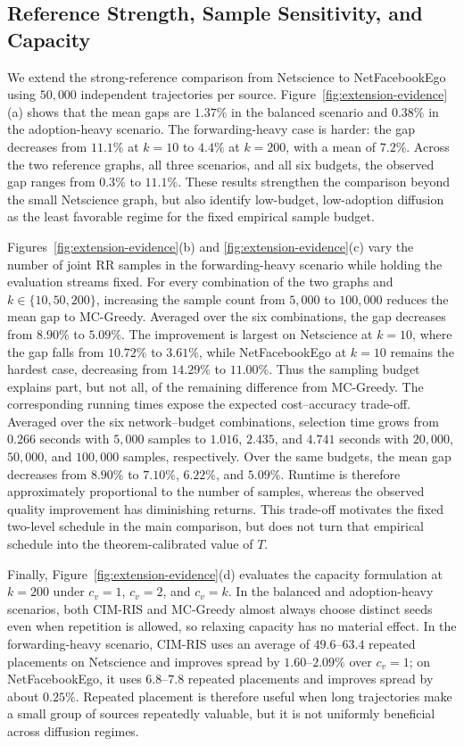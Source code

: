 \documentclass[sigconf,balance=false]{acmart}
\newcommand{\CIMRIS}{\textsc{CIM-RIS}}
\begin{document}
\subsection{Reference Strength, Sample Sensitivity, and Capacity}
\label{sec:exp-robustness}

We extend the strong-reference comparison from Netscience to
NetFacebookEgo using $50{,}000$ independent trajectories per source.
Figure~\ref{fig:extension-evidence}(a) shows that the mean gaps are
$1.37\%$ in the balanced scenario and $0.38\%$ in the adoption-heavy
scenario. The forwarding-heavy case is harder: the gap decreases from
$11.1\%$ at $k=10$ to $4.4\%$ at $k=200$, with a mean of $7.2\%$.
Across the two reference graphs, all three scenarios, and all six budgets,
the observed gap ranges from $0.3\%$ to $11.1\%$.
These results strengthen the comparison beyond the small Netscience graph,
but also identify low-budget, low-adoption diffusion as the least favorable
regime for the fixed empirical sample budget.

Figures~\ref{fig:extension-evidence}(b) and
\ref{fig:extension-evidence}(c) vary the number of joint RR samples in the
forwarding-heavy scenario while holding the evaluation streams fixed.
For every combination of the two graphs and $k\in\{10,50,200\}$, increasing
the sample count from $5{,}000$ to $100{,}000$ reduces the mean gap to
MC-Greedy. Averaged over the six combinations, the gap decreases from
$8.90\%$ to $5.09\%$. The improvement is largest on Netscience at
$k=10$, where the gap falls from $10.72\%$ to $3.61\%$, while
NetFacebookEgo at $k=10$ remains the hardest case, decreasing from
$14.29\%$ to $11.00\%$. Thus the sampling budget explains part, but not
all, of the remaining difference from MC-Greedy.
The corresponding running times expose the expected cost--accuracy trade-off.
Averaged over the six network--budget combinations, selection time grows from
$0.266$ seconds with $5{,}000$ samples to $1.016$, $2.435$, and $4.741$
seconds with $20{,}000$, $50{,}000$, and $100{,}000$ samples, respectively.
Over the same budgets, the mean gap decreases from $8.90\%$ to $7.10\%$,
$6.22\%$, and $5.09\%$.
Runtime is therefore approximately proportional to the number of samples,
whereas the observed quality improvement has diminishing returns.
This trade-off motivates the fixed two-level schedule in the main comparison,
but does not turn that empirical schedule into the theorem-calibrated value of
$T$.

Finally, Figure~\ref{fig:extension-evidence}(d) evaluates the capacity
formulation at $k=200$ under $c_v=1$, $c_v=2$, and $c_v=k$.
In the balanced and adoption-heavy scenarios, both \CIMRIS{} and
MC-Greedy almost always choose distinct seeds even when repetition is
allowed, so relaxing capacity has no material effect.
In the forwarding-heavy scenario, \CIMRIS{} uses an average of
$49.6$--$63.4$ repeated placements on Netscience and improves spread by
$1.60$--$2.09\%$ over $c_v=1$; on NetFacebookEgo, it uses
$6.8$--$7.8$ repeated placements and improves spread by about $0.25\%$.
Repeated placement is therefore useful when long trajectories make a
small group of sources repeatedly valuable, but it is not uniformly
beneficial across diffusion regimes.
\end{document}
